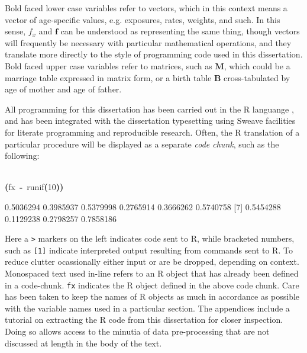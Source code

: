 \documentclass[reqno,12pt,oneside,a4paper]{report} %
\newcommand{\hlnumber}[1]{\textcolor[rgb]{0.0823529411764706,0.0784313725490196,0.709803921568627}{#1}}%
\newcommand{\hlfunctioncall}[1]{\textcolor[rgb]{1,0,0}{#1}}%
\newcommand{\hlkeyword}[1]{\textcolor[rgb]{0,0,0}{\textbf{#1}}}%
\newcommand{\hlassignement}[1]{\textcolor[rgb]{0.215686274509804,0.215686274509804,0.384313725490196}{\textbf{#1}}}%
\newcommand{\hlsymbol}[1]{\textcolor[rgb]{0,0,0}{#1}}%
\newcommand{\hlprompt}[1]{\textcolor[rgb]{0,0,0}{#1}}%
\newcommand{\hlstd}[1]{\textcolor[rgb]{0,0,0}{#1}}%
\newenvironment{Houtput}{\raggedright}{%
%
}
\theoremstyle{plain}
\theoremstyle{definition}
\theoremstyle{remark}
\numberwithin{theorem}{chapter}     %
\renewenvironment{Schunk}{\vspace{\topsep}}{\vspace{\topsep}}
\begin{document}
Bold faced lower case variables refer to vectors, which in this context means a vector of age-specific values, e.g. exposures, rates, weights, and such. In this sense, $f_x$ and $\bm{f}$ can be understood as representing the same thing, though vectors will frequently be necessary with particular mathematical operations, and they translate more directly to the style of programming code used in this dissertation. Bold faced upper case variables refer to matrices, such as $\bm{M}$, which could be a marriage table expressed in matrix form, or a birth table $\bm{B}$ cross-tabulated by age of mother and age of father.

All programming for this dissertation has been carried out in the R languange \citep{Rcitation}, and has been integrated with the dissertation typesetting using Sweave \citep{lmucs-papers:Leisch:2002} facilities for literate programming and reproducible research. Often, the R translation of a particular procedure will be displayed as a separate \textit{code chunk}, such as the following:

\begin{Houtput}
\hspace*{\fill}\\
\hlstd{}\ttfamily\noindent
\hlprompt{\usebox{\hlnormalsizeboxgreaterthan}{\ }}\hlkeyword{(}\hlsymbol{fx}{\ }\hlassignement{\usebox{\hlnormalsizeboxlessthan}-}{\ }\hlfunctioncall{runif}\hlkeyword{(}\hlnumber{10}\hlkeyword{)}\hlkeyword{)}\mbox{}
\normalfont
\hspace*{\fill}\\
\hlstd{}\begin{Schunk}
\begin{Soutput}
 [1] 0.5036294 0.3985937 0.5379998 0.2765914 0.3666262 0.5740758
 [7] 0.5454288 0.1129238 0.2798257 0.7858186
\end{Soutput}

\end{Schunk}
\end{Houtput}

Here a \texttt{>} markers on the left indicates code sent to R, while bracketed numbers, such as \texttt{[1]} indicate interpreted output resulting from commands sent to R. To reduce clutter ocassionally either input or are be dropped, depending on context. Monospaced text used in-line refers to an R object that has already been defined in a code-chunk. \texttt{fx} indicates the R object defined in the above code chunk. Care has been taken to keep the names of R objects as much in accordance as possible with the variable names used in a particular section. The appendices include a tutorial on extracting the R code from this dissertation for closer inspection. Doing so allows access to the minutia of data pre-processing that are not discussed at length in the body of the text.
\end{document}
